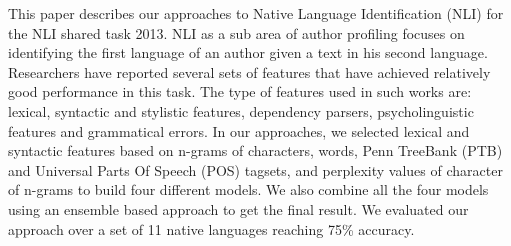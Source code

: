 This paper describes our approaches to Native Language Identification (NLI) for the NLI shared task 2013. NLI as a sub area of author profiling focuses on
 identifying the first language of an author given a text in his second
 language. Researchers have reported several sets of features that have achieved
 relatively good performance in this task. The type of features used in such
 works are: lexical, syntactic and stylistic features, dependency parsers,
 psycholinguistic features and grammatical errors. In our approaches, we 
 selected lexical and syntactic features based on n-grams of characters, words, 
 Penn TreeBank (PTB) and Universal Parts Of Speech (POS) tagsets, and perplexity
 values of character of n-grams to build four different models. We also combine
 all the four models using an ensemble based approach to get the final result.
 We evaluated our approach over a set of 11 native languages reaching 75\%
 accuracy.

